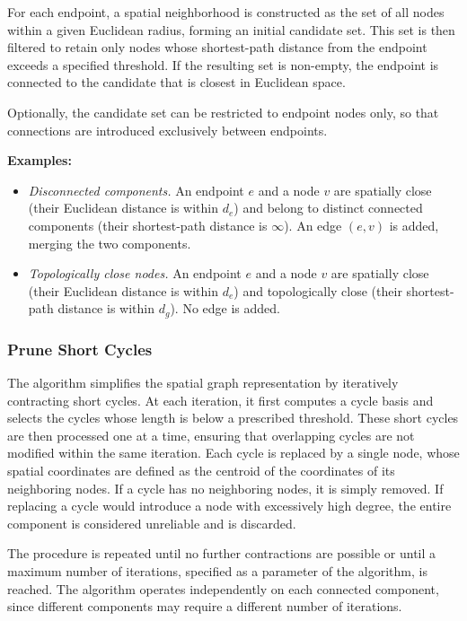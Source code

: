 \documentclass[english,12pt,a4paper]{article}
\begin{document}
	For each endpoint, a spatial neighborhood is constructed as the set of all nodes within a given Euclidean radius, forming an initial candidate set. This set is then filtered to retain only nodes whose shortest-path distance from the endpoint exceeds a specified threshold. If the resulting set is non-empty, the endpoint is connected to the candidate that is closest in Euclidean space.
	
	Optionally, the candidate set can be restricted to endpoint nodes only, so that connections are introduced exclusively between endpoints.
	
	\textbf{Examples:}
	\begin{itemize}
		\item \textit{Disconnected components.} An endpoint $e$ and a node $v$ are spatially close (their Euclidean distance is within $d_e$) and belong to distinct connected components (their shortest-path distance is $\infty$). An edge $(e, v)$ is added, merging the two components.
		\item \textit{Topologically close nodes.}  An endpoint $e$ and a node $v$ are spatially close (their Euclidean distance is within $d_e$) and topologically close (their shortest-path distance is within $d_g$). No edge is added.
	\end{itemize}
	
	\subsubsection{Prune Short Cycles}
	
	The algorithm simplifies the spatial graph representation by iteratively contracting short cycles. At each iteration, it first computes a cycle basis and selects the cycles whose length is below a prescribed threshold. These short cycles are then processed one at a time, ensuring that overlapping cycles are not modified within the same iteration. Each cycle is replaced by a single node, whose spatial coordinates are defined as the centroid of the coordinates of its neighboring nodes. If a cycle has no neighboring nodes, it is simply removed. If replacing a cycle would introduce a node with excessively high degree, the entire component is considered unreliable and is discarded. 
	
	The procedure is repeated until no further contractions are possible or until a maximum number of iterations, specified as a parameter of the algorithm, is reached. The algorithm operates independently on each connected component, since different components may require a different number of iterations.
	
\end{document}
